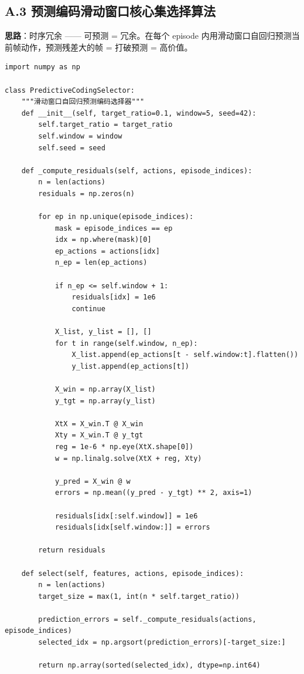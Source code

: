\documentclass[12pt,a4paper]{article}
\begin{document}
\subsection{A.3 预测编码滑动窗口核心集选择算法}

\textbf{思路}：时序冗余 —— 可预测 = 冗余。在每个 episode 内用滑动窗口自回归预测当前帧动作，预测残差大的帧 = 打破预测 = 高价值。

\begin{verbatim}
import numpy as np

class PredictiveCodingSelector:
    """滑动窗口自回归预测编码选择器"""
    def __init__(self, target_ratio=0.1, window=5, seed=42):
        self.target_ratio = target_ratio
        self.window = window
        self.seed = seed
    
    def _compute_residuals(self, actions, episode_indices):
        n = len(actions)
        residuals = np.zeros(n)
        
        for ep in np.unique(episode_indices):
            mask = episode_indices == ep
            idx = np.where(mask)[0]
            ep_actions = actions[idx]
            n_ep = len(ep_actions)
            
            if n_ep <= self.window + 1:
                residuals[idx] = 1e6
                continue
            
            X_list, y_list = [], []
            for t in range(self.window, n_ep):
                X_list.append(ep_actions[t - self.window:t].flatten())
                y_list.append(ep_actions[t])
            
            X_win = np.array(X_list)
            y_tgt = np.array(y_list)
            
            XtX = X_win.T @ X_win
            Xty = X_win.T @ y_tgt
            reg = 1e-6 * np.eye(XtX.shape[0])
            w = np.linalg.solve(XtX + reg, Xty)
            
            y_pred = X_win @ w
            errors = np.mean((y_pred - y_tgt) ** 2, axis=1)
            
            residuals[idx[:self.window]] = 1e6
            residuals[idx[self.window:]] = errors
        
        return residuals
    
    def select(self, features, actions, episode_indices):
        n = len(actions)
        target_size = max(1, int(n * self.target_ratio))
        
        prediction_errors = self._compute_residuals(actions, episode_indices)
        selected_idx = np.argsort(prediction_errors)[-target_size:]
        
        return np.array(sorted(selected_idx), dtype=np.int64)
\end{verbatim}
\end{document}
